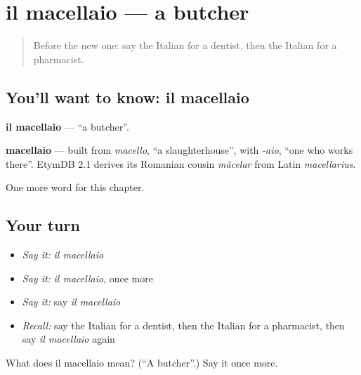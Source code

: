 \section[il macellaio]{il macellaio — a butcher}

\label{lesson:IT-C250-macellaio}



\begin{quote}
Before the new one: say the Italian for a dentist, then the Italian for a pharmacist.
\end{quote}

\subsection*{You'll want to know: il macellaio}
\textbf{il macellaio} — \textquotedblleft{}a butcher\textquotedblright{}.

\begin{cousinweb}
\textbf{macellaio} — built from \emph{macello}, \textquotedblleft{}a slaughterhouse\textquotedblright{}, with \emph{-aio}, \textquotedblleft{}one who works there\textquotedblright{}. EtymDB 2.1 derives its Romanian cousin \emph{măcelar} from Latin \emph{macellarius}.
\end{cousinweb}

\begin{grammarlens}[title={What you've built}]
One more word for this chapter.
\end{grammarlens}

\subsection*{Your turn}
\begin{itemize}
\raggedright
  \item \emph{Say it:} \emph{il macellaio}
  \item \emph{Say it:} \emph{il macellaio}, once more
  \item \emph{Say it:} say \emph{il macellaio}
  \item \emph{Recall:} say the Italian for a dentist, then the Italian for a pharmacist, then say \emph{il macellaio} again
\end{itemize}

\begin{tcolorbox}[breakable,colback=teal!4,colframe=teal!35!black,title={Before you move on}]
What does il macellaio mean? (\textquotedblleft{}A butcher\textquotedblright{}.) Say it once more.
\end{tcolorbox}
